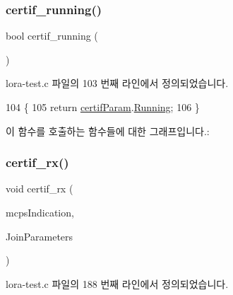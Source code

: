 \subsubsection{\texorpdfstring{certif\+\_\+running()}{certif\_running()}}
{\footnotesize\ttfamily bool certif\+\_\+running (\begin{DoxyParamCaption}\item[{void}]{ }\end{DoxyParamCaption})}



lora-\/test.\+c 파일의 103 번째 라인에서 정의되었습니다.


\begin{DoxyCode}
104 \{
105     \textcolor{keywordflow}{return} \mbox{\hyperlink{lora-test_8c_afed64ac962fb28f92cbc92acb72b0b7a}{certifParam}}.\mbox{\hyperlink{struct_compliance_test__s_ae2e97f1ebd7c956e2c68d1209eabd4b1}{Running}};
106 \}
\end{DoxyCode}
이 함수를 호출하는 함수들에 대한 그래프입니다.\+:
\mbox{\label{lora-test_8c_ad5e51928ecf0cca8d4f33f9e9c10aba4}} 
\subsubsection{\texorpdfstring{certif\+\_\+rx()}{certif\_rx()}}
{\footnotesize\ttfamily void certif\+\_\+rx (\begin{DoxyParamCaption}\item[{\mbox{\hyperlink{group___l_o_r_a_m_a_c_ga202591b6553d63fae89bd42787496616}{Mcps\+Indication\+\_\+t}} $\ast$}]{mcps\+Indication,  }\item[{\mbox{\hyperlink{group___l_o_r_a_m_a_c_gab12f7f7d9bdfb8067d56f7c9f1297d95}{Mlme\+Req\+Join\+\_\+t}} $\ast$}]{Join\+Parameters }\end{DoxyParamCaption})}



lora-\/test.\+c 파일의 188 번째 라인에서 정의되었습니다.


